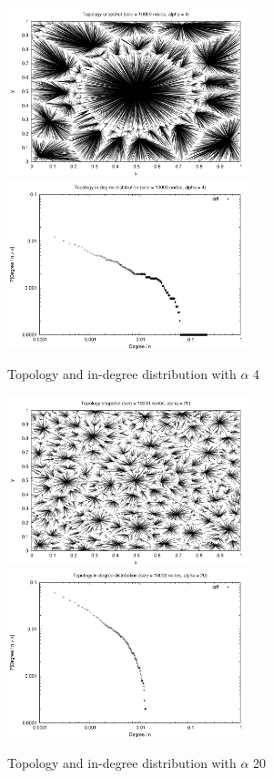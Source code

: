 \documentclass[a4paper,11pt]{article}
\begin{document}
\begin{figure}
\begin{center}
\includegraphics[width=7cm]{pic_alfa4}\hfill
\includegraphics[width=7cm]{picdegree_alfa4}
\end{center}
\caption{Topology and in-degree distribution with $\alpha$ 4\label{t4figure}}
\end{figure}

\begin{figure}
\begin{center}
\includegraphics[width=7cm]{pic_alfa20}\hfill
\includegraphics[width=7cm]{picdegree_alfa20}
\end{center}
\caption{Topology and in-degree distribution with $\alpha$ 20\label{t20figure}}
\end{figure}
\end{document}
